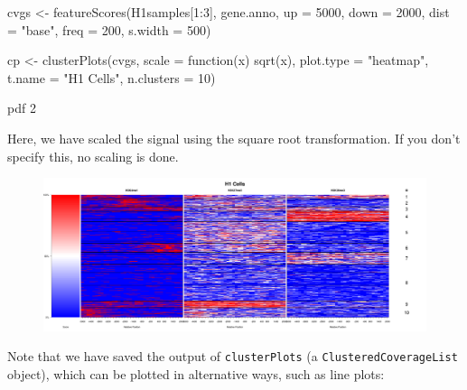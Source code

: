 \begin{Schunk}
\begin{Sinput}
 cvgs <- featureScores(H1samples[1:3], gene.anno, up = 5000, down = 2000, 
     dist = "base", freq = 200, s.width = 500)
\end{Sinput}
\end{Schunk}


\begin{Schunk}
\begin{Sinput}
 cp <- clusterPlots(cvgs, scale = function(x) sqrt(x), plot.type = "heatmap", 
     t.name = "H1 Cells", n.clusters = 10)
\end{Sinput}
\end{Schunk}

\begin{Schunk}
\begin{Soutput}
pdf 
  2 
\end{Soutput}
\end{Schunk}

Here, we have scaled the signal using the square root transformation.  If you don't specify this, no scaling is done.

\begin{figure}[!h]
    \begin{center}
        \includegraphics[height=0.48\textheight, width = 1.1\textwidth]{clusterPlot.png}
    \end{center}
\end{figure}

Note that we have saved the output of \texttt{clusterPlots} (a \texttt{ClusteredCoverageList} object), which can be plotted in alternative ways, such as line plots: 

